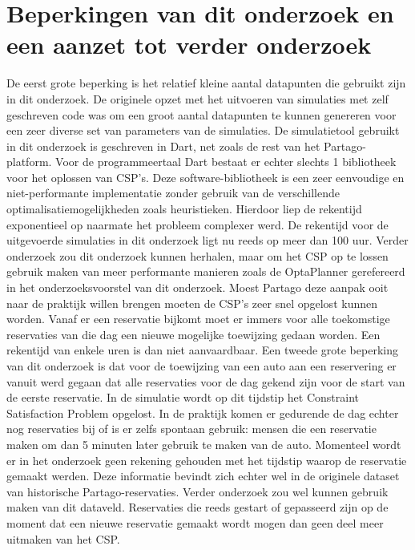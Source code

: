 \section{Beperkingen van dit onderzoek en een aanzet tot verder onderzoek} \label{beperkingen-onderzoek}
De eerst grote beperking is het relatief kleine aantal datapunten die gebruikt zijn in dit onderzoek. De originele opzet met het uitvoeren van simulaties met zelf geschreven code was om een groot aantal datapunten te kunnen genereren voor een zeer diverse set van parameters van de simulaties. De simulatietool gebruikt in dit onderzoek is geschreven in Dart, net zoals de rest van het Partago-platform. Voor de programmeertaal Dart bestaat er echter slechts 1 bibliotheek voor het oplossen van CSP's. Deze software-bibliotheek is een zeer eenvoudige en niet-performante implementatie zonder gebruik van de verschillende optimalisatiemogelijkheden zoals heuristieken. Hierdoor liep de rekentijd exponentieel op naarmate het probleem complexer werd. De rekentijd voor de uitgevoerde simulaties in dit onderzoek ligt nu reeds op meer dan 100 uur. Verder onderzoek zou dit onderzoek kunnen herhalen, maar om het CSP op te lossen gebruik maken van meer performante manieren zoals de OptaPlanner gerefereerd in het onderzoeksvoorstel van dit onderzoek. Moest Partago deze aanpak ooit naar de praktijk willen brengen moeten de CSP's zeer snel opgelost kunnen worden. Vanaf er een reservatie bijkomt moet er immers voor alle toekomstige reservaties van die dag een nieuwe mogelijke toewijzing gedaan worden. Een rekentijd van enkele uren is dan niet aanvaardbaar. 
Een tweede grote beperking van dit onderzoek is dat voor de toewijzing van een auto aan een reservering er vanuit werd gegaan dat alle reservaties voor de dag gekend zijn voor de start van de eerste reservatie. In de simulatie wordt op dit tijdstip het Constraint Satisfaction Problem opgelost. In de praktijk komen er gedurende de dag echter nog reservaties bij of is er zelfs spontaan gebruik: mensen die een reservatie maken om dan 5 minuten later gebruik te maken van de auto. Momenteel wordt er in het onderzoek geen rekening gehouden met het tijdstip waarop de reservatie gemaakt werden. Deze informatie bevindt zich echter wel in de originele dataset van historische Partago-reservaties. Verder onderzoek zou wel kunnen gebruik maken van dit dataveld. Reservaties die reeds gestart of gepasseerd zijn op de moment dat een nieuwe reservatie gemaakt wordt mogen dan geen deel meer uitmaken van het CSP. 

